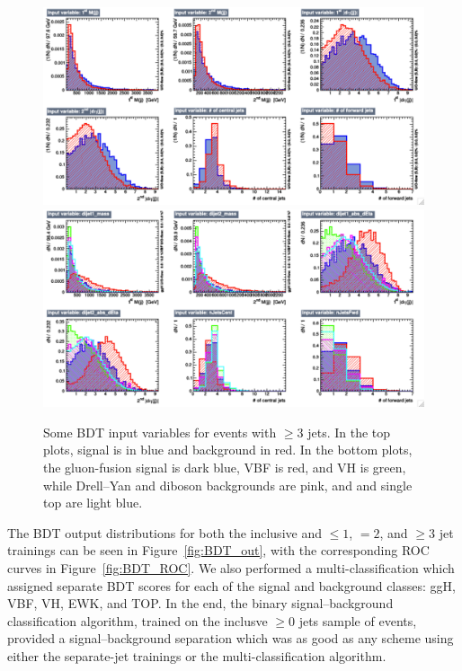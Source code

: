 \begin{figure}
  \includegraphics[width=1.0\linewidth]{figures/bdt_training/BDT_in_ge3j_all_B.pdf}
  \includegraphics[width=1.0\linewidth]{figures/bdt_training/BDT_in_ge3j_sep_B.pdf}
  \caption{Some BDT input variables for events with $\ge 3$ jets.
           In the top plots, signal is in blue and background in red.
           In the bottom plots, the gluon-fusion signal is dark blue, VBF is red, and VH is green,
           while Drell--Yan and diboson backgrounds are pink, and \ttbar and single top are light blue.}
  \label{fig:BDT_in_ge3j_B}
\end{figure}

\clearpage

The BDT output distributions for both the inclusive and $\le 1$, $= 2$, and $\ge 3$
jet trainings can be seen in Figure~\ref{fig:BDT_out}, with the corresponding ROC curves
in Figure~\ref{fig:BDT_ROC}.  We also performed a multi-classification which assigned
separate BDT scores for each of the signal and background classes: ggH, VBF, VH, EWK,
and TOP.  In the end, the binary signal--background classification algorithm, trained
on the inclusve $\ge 0$ jets sample of events, provided a signal--background separation
which was as good as any scheme using either the separate-jet trainings or the
multi-classification algorithm.

